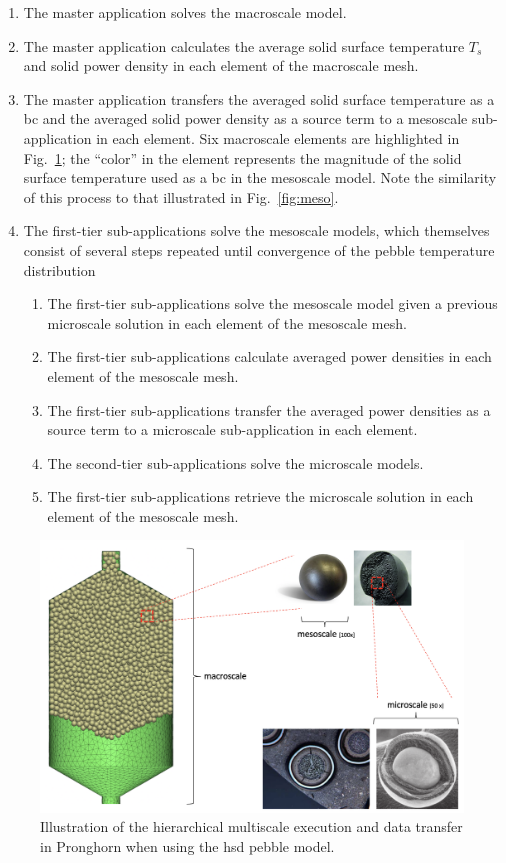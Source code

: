 \begin{enumerate}
\itemsep0.3em
\item The master application solves the macroscale model.
\item The master application calculates the average solid surface temperature \(T_s\) and solid power density in each element of the macroscale mesh.
\item The master application transfers the averaged solid surface temperature as a \gls{bc} and the averaged solid power density as a source term to a mesoscale sub-application in each element. Six macroscale elements are highlighted in Fig.\ \ref{fig:multiscale_pbr}; the ``color'' in the element represents the magnitude of the solid surface temperature used as a \gls{bc} in the mesoscale model. Note the similarity of this process to that illustrated in Fig.\ \ref{fig:meso}.
\item The first-tier sub-applications solve the mesoscale models, which themselves consist of several steps repeated until convergence of the pebble temperature distribution\mdash
	\begin{enumerate}
  \itemsep0.3em
	\item The first-tier sub-applications solve the mesoscale model given a previous microscale solution in each element of the mesoscale mesh.
	\item The first-tier sub-applications calculate averaged power densities in each element of the mesoscale mesh.
	\item The first-tier sub-applications transfer the averaged power densities as a source term to a microscale sub-application in each element.
	\item The second-tier sub-applications solve the microscale models.
	\item The first-tier sub-applications retrieve the microscale solution in each element of the mesoscale mesh.
	\end{enumerate}
\end{enumerate}

\begin{figure}[!h]
\centering
\includegraphics[width=0.8\linewidth]{figs/multiscale_pbr.png}
\caption{Illustration of the hierarchical multiscale execution and data transfer in Pronghorn when using the \gls{hsd} pebble model.}
\label{fig:multiscale_pbr}
\end{figure}

